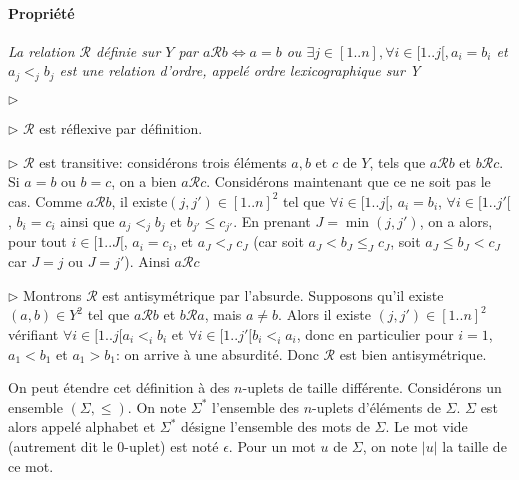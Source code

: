 \documentclass{scrartcl}
\begin{document}
			\paragraph{Propriété} \textsl{La relation $\mathcal{R}$ définie sur $Y$ par 
				$a\mathcal{R}b \Leftrightarrow a=b$ ou $\exists j \in [1..n], \forall i \in [1..j[, a_i = b_i$ et
				$a_j <_j b_j$
				est une relation d'ordre, appelé ordre lexicographique sur Y}
			\begin{labeling}{$\triangleright$}
				\item [$\triangleright$] $\mathcal{R}$ est réflexive par définition.
				\item [$\triangleright$] $\mathcal{R}$ est transitive: considérons trois éléments $a,b$ et $c$ de $Y$,
					tels que $a\mathcal{R}b$ et $b\mathcal{R}c$. Si $a=b$ ou $b=c$, on a bien $a\mathcal{R}c$.
					Considérons maintenant que ce ne soit pas le cas. Comme $a\mathcal{R}b$, il existe$(j,j')\in[1..n]^2$ tel que 
					$\forall i \in [1..j[$, $a_i = b_i$, $\forall i \in [1..j'[$, $b_i=c_i$ ainsi que $a_j <_j b_j$ et $b_{j'} \leq c_{j'}$.
					En prenant $J = \min(j,j')$, on a alors, pour tout $i \in [1..J[$, $a_i = c_i$, et $a_J <_J c_J$ 
					(car soit $a_J < b_J \leq_J c_J$, soit $a_J \leq b_J < c_J$ car $J = j$ ou $J = j'$).
					Ainsi $a\mathcal{R}c$
				\item [$\triangleright$] Montrons $\mathcal{R}$ est antisymétrique par l'absurde.
					Supposons qu'il existe $(a,b)\in Y^2$ tel que $a\mathcal{R}b$ et $b\mathcal{R}a$, mais $a\neq b$.
					Alors il existe $(j,j')\in[1..n]^2$ vérifiant $\forall i \in [1..j[ a_i <_i b_i$ et $\forall i \in [1..j'[ b_i <_i a_i$,
					donc en particulier pour $i=1$, $a_1 < b_1$ et $a_1 > b_1$: on arrive à une absurdité.
					Donc $\mathcal{R}$ est bien antisymétrique.
			\end{labeling}

			On peut étendre cet définition à des $n$-uplets de taille différente. Considérons un ensemble $(\Sigma,\leq)$.
			On note $\Sigma^*$ l'ensemble des $n$-uplets d'éléments de $\Sigma$. 
			$\Sigma$ est alors appelé alphabet et $\Sigma^*$ désigne l'ensemble des mots de $\Sigma$.
			Le mot vide (autrement dit le 0-uplet) est noté $\epsilon$.
			Pour un mot $u$ de $\Sigma$, on note $|u|$ la taille de ce mot.
\end{document}
